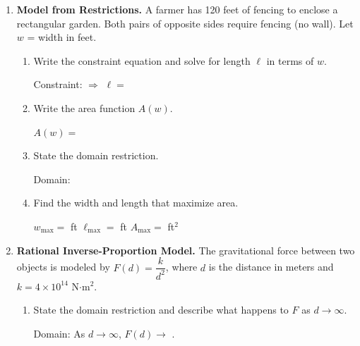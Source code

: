 \documentclass[10pt]{article}
\begin{document}
\namedateperiod

\vspace{0.1in}

\begin{enumerate}[itemsep=18pt]

\item \textbf{Model from Restrictions.} A farmer has 120 feet of fencing to enclose a
      rectangular garden. Both pairs of opposite sides require fencing (no wall).
      Let $w$ = width in feet.

      \begin{enumerate}[label=(\alph*), itemsep=8pt]
        \item Write the constraint equation and solve for length $\ell$ in terms of $w$.

              \vspace{0.06in}
              Constraint: \blank{5cm} \quad $\Rightarrow$ \quad $\ell = $ \blank{4cm}

        \item Write the area function $A(w)$.

              \vspace{0.06in}
              $A(w) = $ \blank{7cm}

        \item State the domain restriction.

              \vspace{0.06in}
              Domain: \blank{5cm}

        \item Find the width and length that maximize area.

              \vspace{0.06in}
              $w_{\max} = $ \blank{3cm} ft \quad $\ell_{\max} = $ \blank{3cm} ft \quad $A_{\max} = $ \blank{3cm} ft$^2$
      \end{enumerate}

\item \textbf{Rational Inverse-Proportion Model.} The gravitational force between two objects
      is modeled by $F(d) = \dfrac{k}{d^2}$, where $d$ is the distance in meters and $k = 4\times10^{14}$
      N$\cdot$m$^2$.

      \begin{enumerate}[label=(\alph*), itemsep=8pt]
        \item State the domain restriction and describe what happens to $F$ as $d \to \infty$.

              \vspace{0.06in}
              Domain: \blank{3cm} \quad As $d \to \infty$, $F(d) \to $ \blank{2cm}.


\end{enumerate}
\end{enumerate}
\end{document}
